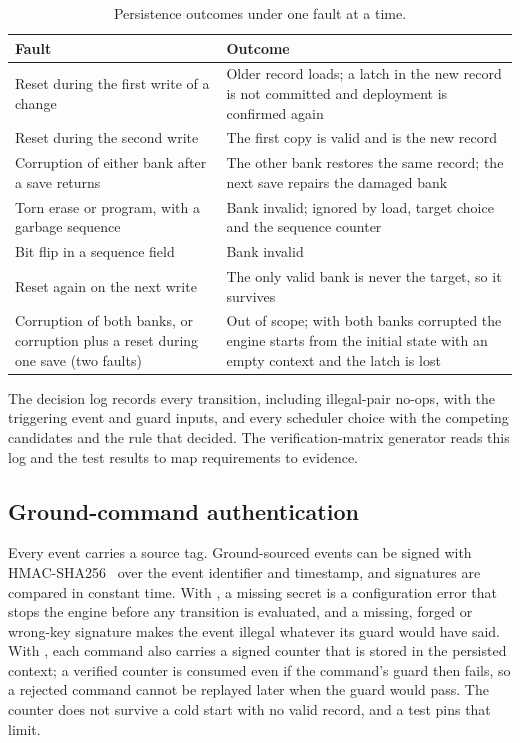 \documentclass[preprint,12pt]{elsarticle}
\begin{document}
\begin{table}[t]
\centering
\footnotesize
\caption{Persistence outcomes under one fault at a time.}
\label{tab:persist}
\begin{tabular}{@{}p{}p{}@{}}
\toprule
Fault & Outcome \\
\midrule
Reset during the first write of a change & Older record loads; a latch in the new record is not committed and deployment is confirmed again \\
Reset during the second write & The first copy is valid and is the new record \\
Corruption of either bank after a save returns & The other bank restores the same record; the next save repairs the damaged bank \\
Torn erase or program, with a garbage sequence & Bank invalid; ignored by load, target choice and the sequence counter \\
Bit flip in a sequence field & Bank invalid \\
Reset again on the next write & The only valid bank is never the target, so it survives \\
Corruption of both banks, or corruption plus a reset during one save (two faults) & Out of scope; with both banks corrupted the engine starts from the initial state with an empty context and the latch is lost \\
\bottomrule
\end{tabular}
\end{table}

The decision log records every transition, including illegal-pair no-ops, with the triggering event and guard inputs, and every scheduler choice with the competing candidates and the rule that decided. The verification-matrix generator reads this log and the test results to map requirements to evidence.

\subsection{Ground-command authentication}\label{sec:auth}

Every event carries a source tag. Ground-sourced events can be signed with HMAC-SHA256~\cite{RFC2104,Bellare1996HMAC,NIST2015SHS} over the event identifier and timestamp, and signatures are compared in constant time. With , a missing secret is a configuration error that stops the engine before any transition is evaluated, and a missing, forged or wrong-key signature makes the event illegal whatever its guard would have said. With , each command also carries a signed counter that is stored in the persisted context; a verified counter is consumed even if the command's guard then fails, so a rejected command cannot be replayed later when the guard would pass. The counter does not survive a cold start with no valid record, and a test pins that limit.
\end{document}

